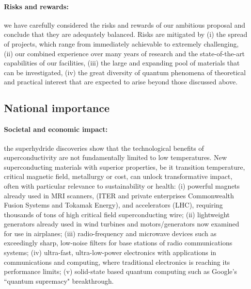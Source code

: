 \paragraph{Risks and rewards:} we have carefully considered the risks and
rewards of our ambitious proposal and conclude that they are
adequately balanced. Risks are mitigated by (i) the spread of
projects, which range from immediately achievable to extremely
challenging, (ii) our combined experience over many years of research
and the state-of-the-art capabilities of our facilities, (iii) the large
and expanding pool of materials that can be investigated, (iv) the
great diversity of quantum phenomena of theoretical and practical
interest that are expected to arise beyond those discussed above.



\subsection*{National importance}
\paragraph{Societal and economic impact:}
the superhydride discoveries show that the technological benefits of superconductivity are not fundamentally limited to low temperatures. 
New superconducting materials with superior properties, be it transition temperature,
critical magnetic field, metallurgy or cost, 
can unlock transformative impact, often with particular relevance to sustainability or health: 
(i) powerful magnets already used in MRI scanners, %
  (ITER and private enterprises Commonwealth Fusion Systems and Tokamak Energy), and accelerators (LHC), requiring  thousands of tons of high critical field superconducting wire; 
(ii) lightweight generators already used in wind turbines and motors/generators now examined for use in airplanes;   
(iii) radio-frequency and microwave devices such as exceedingly sharp, low-noise filters for base stations of radio communications systems; 
(iv) ultra-fast, ultra-low-power electronics with applications in communications and computing, where traditional electronics is reaching its performance limits; 
(v) solid-state based quantum computing such as Google's ``quantum supremacy" breakthrough.

